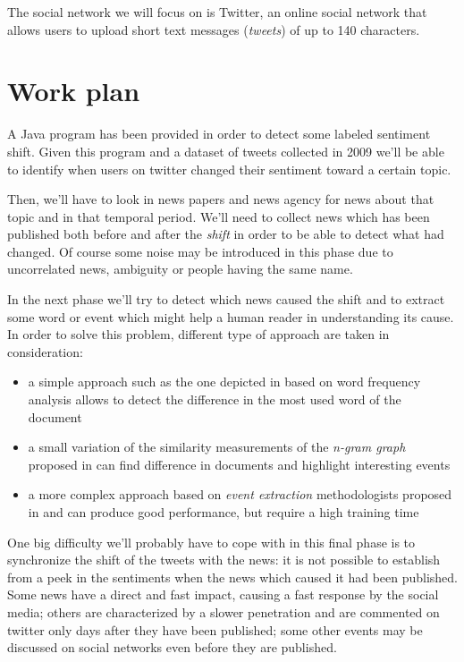 \documentclass[a4paper]{article}
\begin{document}
The social network we will focus on is Twitter, an online social network that
allows users to upload short text messages (\emph{tweets}) of up to 140 characters.

\section{Work plan}
A Java program has been provided in order to detect some labeled sentiment
shift. Given this program and a dataset of tweets collected in 2009 we'll be
able to identify when users on twitter changed their sentiment toward a certain
topic.

Then, we'll have to look in news papers and news agency for news about that
topic and in that temporal period. We'll need to collect news which has been
published both before and after the \emph{shift} in order to be able to detect
what had changed. 
Of course some noise may be introduced in this phase due to uncorrelated news,
ambiguity or people having the same name.

In the next phase we'll try to detect which news caused the shift and to extract
some word or event which might help a human reader in understanding its cause. In order to solve this problem, different type of approach are taken in consideration:
\begin{itemize}
\item a simple approach such as the one depicted in \cite{Bifet} based on word frequency analysis allows to detect the difference in the most used word of the document
\item a small variation of the similarity measurements of the \emph{n-gram graph} proposed in \cite{Giannakopoulos} can find difference in documents and highlight interesting events
\item a more complex approach based on \emph{event extraction} methodologists proposed in \cite{Tanev} and \cite{Naughton} can produce good performance, but require a high training time
\end{itemize}

One big difficulty we'll probably have to cope with in this final phase is to
synchronize the shift of the tweets with the news: it is not possible to
establish from a peek in the sentiments when the news which caused it had been
published. Some news have a direct and fast impact, causing a fast
response by the social media; others are characterized by a slower penetration
and are commented on twitter only days after they have been published; some
other events may be discussed on social networks even before they are
published.
\end{document}
